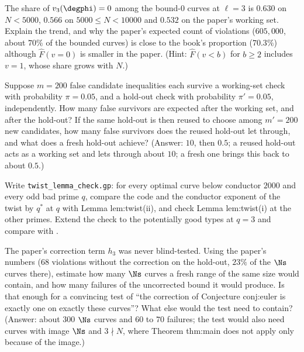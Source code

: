 \begin{sloppypar}
\begin{exercise}\label{exer:computation:f0}
The share of $v_3(\degphi)=0$ among the bound-$0$ curves at $\ell=3$ is $0.630$ on $N<5000$, $0.566$ on $5000\le N<10000$ and $0.532$ on the paper's working
set. Explain the trend, and why the paper's expected count of violations ($605{,}000$, about $70\%$ of the bounded curves) is close to the book's
proportion ($70.3\%$) although $\hat F(v=0)$ is smaller in the paper.
(Hint: $\hat F(v<b)$ for $b\ge2$ includes $v=1$, whose share grows with $N$.)
\end{exercise}

\begin{exercise}\label{exer:computation:multiple}
Suppose $m=200$ false candidate inequalities each survive a working-set check with probability $\pi=0.05$, and a hold-out check with probability $\pi'=0.05$,
independently. How many false survivors are expected after the working set, and after the hold-out? If the same hold-out is then reused to choose among
$m'=200$ new candidates, how many false survivors does the reused hold-out let through, and what does a fresh hold-out achieve? (Answer: $10$, then
$0.5$; a reused hold-out acts as a working set and lets through about $10$; a fresh one brings this back to about $0.5$.)
\end{exercise}

\begin{exercise}\label{exer:computation:twistcheck}
Write \texttt{twist\_lemma\_check.gp}: for every optimal curve below conductor $2000$ and every odd bad prime $q$, compare the code and the conductor exponent
of the twist by $q^*$ at $q$ with Lemma lem:twist(ii), and check Lemma lem:twist(i) at the other primes. Extend the check to the potentially good types at
$q=3$ and compare with .
\end{exercise}

\begin{exercise}\label{exer:computation:fresh-holdout}
The paper's correction term $h_3$ was never blind-tested. Using the paper's numbers ($68$ violations without the correction on the hold-out, $23\%$ of
the $\Ns$ curves there), estimate how many $\Ns$ curves a fresh range of the same size would contain, and how many failures of the uncorrected bound it
would produce. Is that enough for a convincing test of ``the correction of Conjecture conj:euler is exactly one on exactly these curves''? What else would the test need to
contain? (Answer: about $300$ $\Ns$ curves and $60$ to $70$ failures; the test would also need curves with image $\Ns$ and $3\nmid N$, where Theorem thm:main
does not apply only because of the image.)
\end{exercise}


\end{sloppypar}
